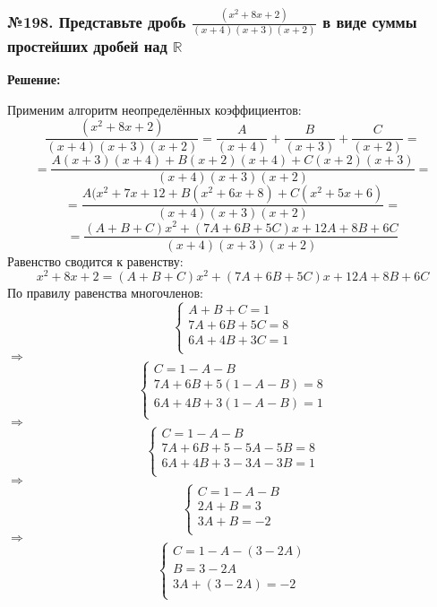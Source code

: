\documentclass[a4paper]{article}
\begin{document}
\subsubsection*{№198. Представьте дробь $\frac{(x^2+8x+2)}{(x+4)(x+3)(x+2)}$ в виде суммы простейших дробей над $\mathbb{R}$}
\textbf{Решение:} \par
Применим алгоритм неопределённых коэффициентов:
\[\frac{(x^2+8x+2)}{(x+4)(x+3)(x+2)}=\frac{A}{(x+4)}+\frac{B}{(x+3)}+\frac{C}{(x+2)}=\]
\[=\frac{A(x+3)(x+4)+B(x+2)(x+4)+C(x+2)(x+3)}{(x+4)(x+3)(x+2)}=\]
\[=\frac{A(x^2+7x+12+B(x^2+6x+8)+C(x^2+5x+6)}{(x+4)(x+3)(x+2)}=\]
\[=\frac{(A+B+C)x^2+(7A+6B+5C)x+12A+8B+6C}{(x+4)(x+3)(x+2)}\]
Равенство сводится к равенству:
\[x^2+8x+2=(A+B+C)x^2+(7A+6B+5C)x+12A+8B+6C\]
По правилу равенства многочленов:
\begin{equation*}
 \begin{cases}
	A+B+C=1 \\
	7A+6B+5C=8 \\
	6A+4B+3C=1 \\
 \end{cases}
\end{equation*}
$\Rightarrow$
\begin{equation*}
 \begin{cases}
	C=1-A-B \\
	7A+6B+5(1-A-B)=8 \\
	6A+4B+3(1-A-B)=1 \\
 \end{cases}
\end{equation*}
$\Rightarrow$
\begin{equation*}
 \begin{cases}
	C=1-A-B \\
	7A+6B+5-5A-5B=8 \\
	6A+4B+3-3A-3B=1 \\
 \end{cases}
\end{equation*}
$\Rightarrow$
\begin{equation*}
 \begin{cases}
	C=1-A-B \\
	2A+B=3 \\
	3A+B=-2 \\
 \end{cases}
\end{equation*}
$\Rightarrow$
\begin{equation*}
 \begin{cases}
	C=1-A-(3-2A) \\
	B=3-2A \\
	3A+(3-2A)=-2 \\
 \end{cases}
\end{equation*}
\end{document}
